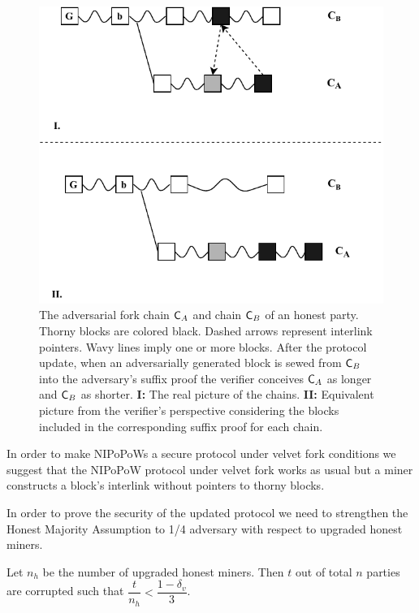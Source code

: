 \begin{figure}[h!]
	\begin{center}
		\includegraphics[width=0.9\columnwidth]{figures/injection.pdf}
	\end{center}
	\caption{The adversarial fork chain $\mathsf{C}_A$ and chain $\mathsf{C}_B$ of an honest party. Thorny blocks are colored black. Dashed arrows represent interlink pointers. Wavy lines imply one or more blocks. After the protocol update, when an adversarially generated block is sewed from $\mathsf{C}_B$ into the adversary's suffix proof the verifier conceives $\mathsf{C}_A$ as longer and $\mathsf{C}_B$ as shorter. \textbf{I:} The real picture of the chains. \textbf{II:} Equivalent picture from the verifier's perspective considering the blocks included in the corresponding suffix proof for each chain.}
	\label{fig:injection}
\end{figure}

In order to make NIPoPoWs a secure protocol under velvet fork conditions we suggest that the NIPoPoW protocol under velvet fork works as usual but a miner constructs a block's interlink without pointers to thorny blocks.

In order to prove the security of the updated protocol we need to strengthen the Honest Majority Assumption to 1/4 adversary with respect to upgraded honest miners.

\begin{definition}
	Let $n_h$ be the number of upgraded honest miners. Then $t$ out of total $n$ parties are corrupted such that $\dfrac{t}{n_h} < \dfrac{1 - \delta_v}{3} $.
	\label{defn:velvet_honest_majority}
\end{definition}

